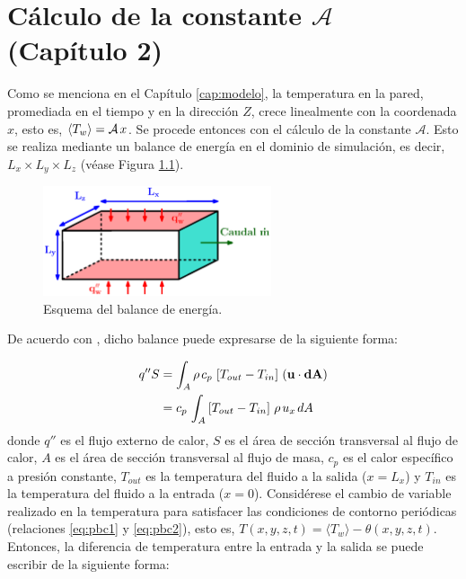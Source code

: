 \chapter{Cálculo de la constante $\mathcal{A}$ (Capítulo 2)} \label{apen:constante-A}

Como se menciona en el Capítulo \ref{cap:modelo}, la temperatura en la pared, promediada en el tiempo y en la dirección $Z$, crece linealmente con la coordenada $x$, esto es, $\langle T_w \rangle = \mathcal{A} \hspace{0.5mm} x $. Se procede entonces con el cálculo de la constante $\mathcal{A}$. Esto se realiza mediante un balance de energía en el dominio de simulación, es decir, $L_x \times L_y \times L_z$ (véase Figura \ref{fig:apendice-b}). 

\begin{figure}[H]
  \centering  
    \includegraphics[width=0.6\textwidth]{figures/apendices/apendice_b.eps}
  \caption{Esquema del balance de energía.}
  \label{fig:apendice-b}
\end{figure}
De acuerdo con \cite{cengelheat}, dicho balance puede expresarse de la siguiente forma:

\begin{align*}
q'' S &= \int_A \rho \hspace{0.5mm} c_p \hspace{0.5mm} \left[ T_{out} - T_{in} \right] \hspace{0.5mm} (\mathbf{u} \cdot \mathbf{dA}) \\
	  &= c_p \hspace{0.5mm} \int_A \left[ T_{out} - T_{in} \right] \hspace{0.5mm} \rho \hspace{0.5mm} u_x \hspace{0.5mm} dA
\end{align*}
donde $q''$ es el flujo externo de calor, $S$ es el área de sección transversal al flujo de calor, $A$ es el área de sección transversal al flujo de masa, $c_p$ es el calor específico a presión constante, $T_{out}$ es la temperatura del fluido a la salida ($x=L_x$) y $T_{in}$ es la temperatura del fluido a la entrada ($x=0$). Considérese el cambio de variable realizado en la temperatura para satisfacer las condiciones de contorno periódicas (relaciones \ref{eq:pbc1} y \ref{eq:pbc2}), esto es, $T(x,y,z,t)= \langle T_w \rangle - \theta(x,y,z,t)$. Entonces, la diferencia de temperatura entre la entrada y la salida se puede escribir de la siguiente forma:

